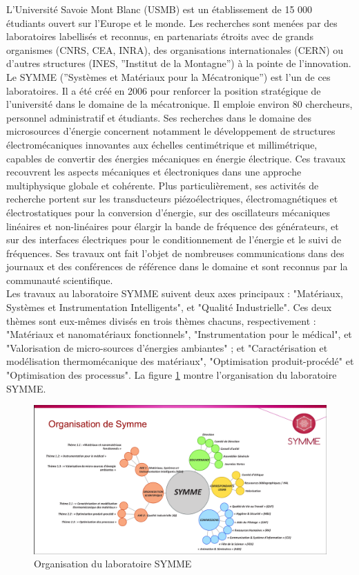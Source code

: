 \documentclass[a4paper, french, 12pt, titlepage]{article}
\begin{document}
L'Université Savoie Mont Blanc (USMB) est un établissement de 15 000 étudiants ouvert sur l'Europe et le monde.
Les recherches sont menées par des laboratoires labellisés et reconnus, en partenariats étroits avec de grands organismes (CNRS, CEA, INRA), des organisations internationales (CERN) ou d'autres structures (INES, ”Institut de la Montagne”) à la pointe de l'innovation.
Le SYMME (”Systèmes et Matériaux pour la Mécatronique”) est l'un de ces laboratoires.
Il a été créé en 2006 pour renforcer la position stratégique de l'université dans le domaine de la mécatronique.
Il emploie environ 80 chercheurs, personnel administratif et étudiants.
Ses recherches dans le domaine des microsources d'énergie concernent notamment le développement de structures électromécaniques innovantes aux échelles centimétrique et millimétrique, capables de convertir des énergies mécaniques en énergie électrique.
Ces travaux recouvrent les aspects mécaniques et électroniques dans une approche multiphysique globale et cohérente.
Plus particulièrement, ses activités de recherche portent sur les transducteurs piézoélectriques, électromagnétiques et électrostatiques pour la conversion d'énergie, sur des oscillateurs mécaniques linéaires et non-linéaires pour élargir la bande de fréquence des générateurs, et sur des interfaces électriques pour le conditionnement de l'énergie et le suivi de fréquences.
Ses travaux ont fait l'objet de nombreuses communications dans des journaux et des conférences de référence dans le domaine et sont reconnus par la communauté scientifique.\\


Les travaux au laboratoire SYMME suivent deux axes principaux : "Matériaux, Systèmes et Instrumentation Intelligents", et "Qualité Industrielle".
Ces deux thèmes sont eux-mêmes divisés en trois thèmes chacuns, respectivement : "Matériaux et nanomatériaux fonctionnels", "Instrumentation pour le médical", et "Valorisation de micro-sources d'énergies ambiantes" ; et "Caractérisation et modélisation thermomécanique des matériaux", "Optimisation produit-procédé" et "Optimisation des processus".
La figure \ref{fig:fig1} montre l'organisation du laboratoire SYMME.

\begin{figure}[H]
  \includegraphics[width=\linewidth]{organigramme.png}
  \caption{Organisation du laboratoire SYMME}
  \label{fig:fig1}
\end{figure}
\end{document}
